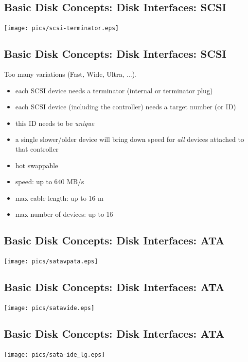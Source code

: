 \documentclass[xga]{xdvislides}
\begin{document}
\subsection{Basic Disk Concepts: Disk Interfaces: SCSI}
\vfill
	\begin{center}
		\texttt{[image: pics/scsi-terminator.eps]} \\
	\end{center}
\vfill

\subsection{Basic Disk Concepts: Disk Interfaces: SCSI}
Too many variations (Fast, Wide, Ultra, ...).
\begin{itemize}
	\item each SCSI device needs a terminator (internal or terminator plug)
	\item each SCSI device (including the controller) needs a target number
		(or ID)
	\item this ID needs to be {\em unique}
	\item a single slower/older device will bring down speed for {\em all}
		devices attached to that controller
	\item hot swappable
	\item speed: up to 640 MB/s
	\item max cable length: up to 16 m
	\item max number of devices: up to 16
\end{itemize}

\subsection{Basic Disk Concepts: Disk Interfaces: ATA}
\vfill
	\begin{center}
		\texttt{[image: pics/satavpata.eps]} \\
	\end{center}
\vfill

\subsection{Basic Disk Concepts: Disk Interfaces: ATA}
\vfill
	\begin{center}
		\texttt{[image: pics/satavide.eps]} \\
	\end{center}
\vfill

\subsection{Basic Disk Concepts: Disk Interfaces: ATA}
\vfill
	\begin{center}
		\texttt{[image: pics/sata-ide\_lg.eps]} \\
	\end{center}
\vfill
\end{document}
